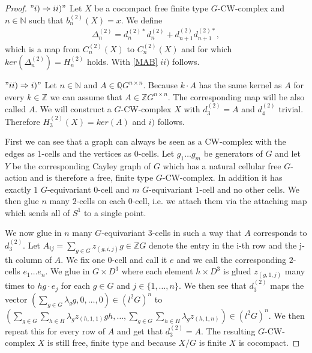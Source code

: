 \documentclass[12pt,a4paper]{scrartcl}
\numberwithin{equation}{section}
\newcommand{\Q}{\mathbb{Q}} %
\newcommand{\Z}{\mathbb{Z}} %
\newcommand{\N}{\mathbb{N}} %
\newcommand{\2}{\mathbb{Z} / 2 \mathbb{Z}}
\newcommand{\1}{\bar{1}}
\newcommand{\0}{\bar{0}}
\begin{document}
\begin{proof}
	$"i) \Rightarrow ii)"$ Let $X$ be a cocompact free finite type $G$-CW-complex and $n \in \N$ such that $b_n^{(2)}(X)=x$. We define 
	\begin{align*}
		\Delta_n^{(2)} = d_n^{(2)*} d_n^{(2)} + d_{n+1}^{(2)} d_{n+1}^{(2)*},
	\end{align*}
	which is a map from $C_n^{(2)}(X)$ to $C_n^{(2)}(X)$ and for which $ker(\Delta_n^{(2)}) = H_n^{(2)}$ holds. With \ref{MAB} $ii)$ follows. 
	
	$"ii) \Rightarrow i)"$ Let $n \in \N$ and $A\in \Q G^{n \times n}$. Because $k \cdot A$ has the same kernel as $A$ for every $k \in \Z$ we can assume that $A \in \Z G^{n \times n}$. The corresponding map will be also called $A$. We will construct a $G$-CW-complex $X$ with $d_3^{(2)} = A$ and $d_4^{(2)}$ trivial. Therefore $H_3^{(2)}(X) = ker(A)$ and $i)$ follows.
	
	First we can see that a graph can always be seen as a CW-complex with the edges as 1-cells and the vertices as 0-cells. Let $g_1 \ldots g_m$ be generators of $G$ and let $Y$ be the corresponding Cayley graph of $G$ which has a natural cellular free $G$-action and is therefore a free, finite type $G$-CW-complex. In addition it has exactly $1$ $G$-equivariant $0$-cell and $m$ $G$-equivariant $1$-cell and no other cells. We then glue $n$ many $2$-cells on each $0$-cell, i.e. we attach them via the attaching map which sends all of $S^1$ to a single point. 
	
	We now glue in $n$ many $G$-equivariant $3$-cells in such a way that $A$ corresponds to $d_3^{(2)}$. Let $A_{ij} = \sum_{g \in G} z_{(g, i, j)} g \in \Z G$ denote the entry in the i-th row and the j-th column of $A$. We fix one $0$-cell and call it $e$ and we call the corresponding $2$-cells $e_1 \ldots e_n$. We glue in $G \times D^3$ where each element $h \times D^3$ is glued $z_{(g, 1, j)}$ many times to $h g \cdot e_j$ for each $g \in G$ and $j \in \{1, \ldots, n\}$. We then see that $d_3^{(2)}$ maps the vector $(\sum_{g \in G} \lambda_g g, 0 , \ldots , 0) \in (l^2 G)^n$ to $(\sum_{g \in G} \sum_{h \in H} \lambda_g z_{(h, 1, 1)} g h, \ldots , \sum_{g \in G} \sum_{h \in H} \lambda_g z_{(h, 1, n)}) \in (l^2 G)^n$. We then repeat this for every row of $A$ and get that $d_3^{(2)} = A$. The resulting $G$-CW-complex $X$ is still free, finite type and because $X/G$ is finite $X$ is cocompact.
\end{proof}
\end{document}

